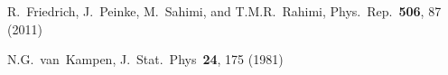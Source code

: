 \documentclass[aps,twocolumn,superscriptaddress,showpacs,showkeys]{revtex4}
\newcommand{\Ito}{It\^o}
\begin{document}
{\begin{thebibliography}{00}









   R.~Friedrich, J.~Peinke, M.~Sahimi, and T.M.R.~Rahimi,
                        Phys.~Rep.~{\bf 506}, 87 (2011)



   N.G.~van~Kampen,
                        J.~Stat.~Phys~{\bf 24}, 175 (1981)




\end{thebibliography}}
\end{document}
